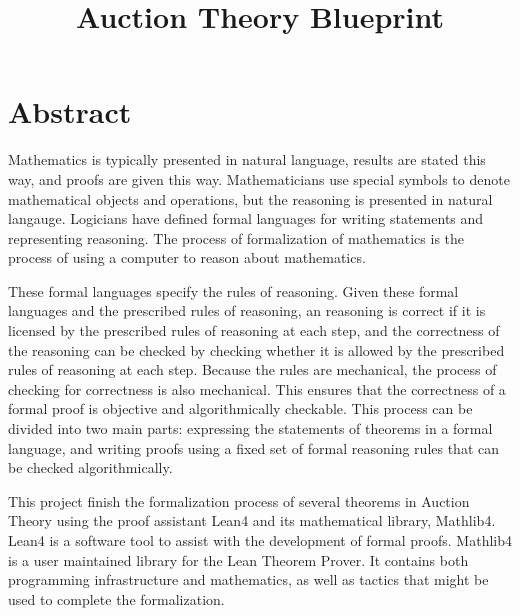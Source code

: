 \title{Auction Theory Blueprint} 




\maketitle


\tableofcontents
\section{Abstract}
Mathematics is typically presented in natural language, results are stated this way, and proofs are given this way. Mathematicians use special symbols to denote mathematical objects and operations, but the reasoning is presented in natural langauge. Logicians have defined formal languages for writing statements and representing reasoning. The process of formalization of mathematics is the process of using a computer to reason about mathematics.

These formal languages specify the rules of reasoning. Given these formal languages and the prescribed rules of reasoning, an reasoning is correct if it is licensed by the prescribed rules of reasoning at each step, and the correctness of the reasoning can be checked by checking whether it is allowed by the prescribed rules of reasoning at each step. Because the rules are mechanical, the process of checking for correctness is also mechanical. This ensures that the correctness of a formal proof is objective and algorithmically checkable.
This process can be divided into two main parts: expressing the statements of theorems in a formal language, and writing proofs using a fixed set of formal reasoning rules that can be checked algorithmically.

This project finish the formalization process of several theorems in Auction Theory using the proof assistant Lean4 and its mathematical library, Mathlib4. Lean4 is a software tool to assist with the development of formal proofs. Mathlib4 is a user maintained library for the Lean Theorem Prover. It contains both programming infrastructure and mathematics, as well as tactics that might be used to complete the formalization.

